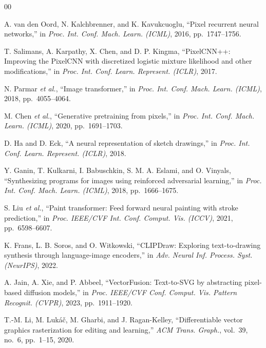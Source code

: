 \documentclass[conference,a4paper]{IEEEtran}
\begin{document}
\begin{thebibliography}{00}

A. van den Oord, N. Kalchbrenner, and K. Kavukcuoglu,
``Pixel recurrent neural networks,''
in \textit{Proc. Int. Conf. Mach. Learn. (ICML)}, 2016, pp.~1747--1756.

T. Salimans, A. Karpathy, X. Chen, and D. P. Kingma,
``PixelCNN++: Improving the PixelCNN with discretized logistic mixture
likelihood and other modifications,''
in \textit{Proc. Int. Conf. Learn. Represent. (ICLR)}, 2017.

N. Parmar \textit{et al.},
``Image transformer,''
in \textit{Proc. Int. Conf. Mach. Learn. (ICML)}, 2018, pp.~4055--4064.

M. Chen \textit{et al.},
``Generative pretraining from pixels,''
in \textit{Proc. Int. Conf. Mach. Learn. (ICML)}, 2020, pp.~1691--1703.

D. Ha and D. Eck,
``A neural representation of sketch drawings,''
in \textit{Proc. Int. Conf. Learn. Represent. (ICLR)}, 2018.

Y. Ganin, T. Kulkarni, I. Babuschkin, S. M. A. Eslami, and O. Vinyals,
``Synthesizing programs for images using reinforced adversarial
learning,''
in \textit{Proc. Int. Conf. Mach. Learn. (ICML)}, 2018, pp.~1666--1675.

S. Liu \textit{et al.},
``Paint transformer: Feed forward neural painting with stroke
prediction,''
in \textit{Proc. IEEE/CVF Int. Conf. Comput. Vis. (ICCV)}, 2021,
pp.~6598--6607.

K. Frans, L. B. Soros, and O. Witkowski,
``CLIPDraw: Exploring text-to-drawing synthesis through language-image
encoders,''
in \textit{Adv. Neural Inf. Process. Syst. (NeurIPS)}, 2022.

A. Jain, A. Xie, and P. Abbeel,
``VectorFusion: Text-to-SVG by abstracting pixel-based diffusion
models,''
in \textit{Proc. IEEE/CVF Conf. Comput. Vis. Pattern Recognit. (CVPR)},
2023, pp.~1911--1920.

T.-M. Li, M. Luk{\'a}{\v c}, M. Gharbi, and J. Ragan-Kelley,
``Differentiable vector graphics rasterization for editing and
learning,''
\textit{ACM Trans. Graph.}, vol.~39, no.~6, pp.~1--15, 2020.


\end{thebibliography}
\end{document}
